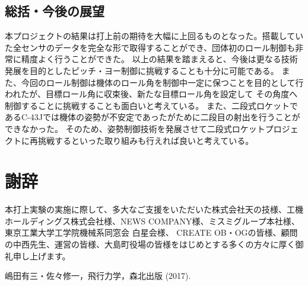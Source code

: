 \documentclass[a4paper,11pt,uplatex]{jsarticle}
\begin{document}
\subsection{総括・今後の展望}
本プロジェクトの結果は打上前の期待を大幅に上回るものとなった。搭載していた全センサのデータを完全な形で取得することができ、団体初のロール制御も非常に精度よく行うことができた。
以上の結果を踏まえると、今後は更なる技術発展を目的としたピッチ・ヨー制御に挑戦することも十分に可能である。
また、今回のロール制御は機体のロール角を制御中一定に保つことを目的として行われたが、目標ロール角に収束後、新たな目標ロール角を設定して
その角度へ制御することに挑戦することも面白いと考えている。
また、二段式ロケットであるC-43Jでは機体の姿勢が不安定であったがために二段目の射出を行うことができなかった。
そのため、姿勢制御技術を発展させて二段式ロケットプロジェクトに再挑戦するといった取り組みも行えれば良いと考えている。

\section{謝辞}
本打上実験の実施に際して、多大なご支援をいただいた株式会社天の技様、工機ホールディングス株式会社様、NEWS COMPANY様、ミスミグループ本社様、東京工業大学工学院機械系同窓会 白星会様、
CREATE OB・OGの皆様、顧問の中西先生、運営の皆様、大島町役場の皆様をはじめとする多くの方々に厚く御礼申し上げます。

\begin{thebibliography}{99}
	 嶋田有三・佐々修一，飛行力学，森北出版 (2017).
\end{thebibliography}
\end{document}
